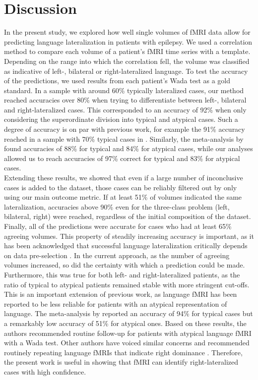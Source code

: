 \documentclass[fleqn,10pt]{SelfArx} %
\begin{document}
\section{Discussion}

In the present study, we explored how well single volumes of fMRI data allow for predicting language lateralization in patients with epilepsy. We used a correlation method to compare each volume of a patient’s fMRI time series with a template. Depending on the range into which the correlation fell, the volume was classified as indicative of left-, bilateral or right-lateralized language. To test the accuracy of the predictions, we used results from each patient’s Wada test as a gold standard. In a sample with around 60\% typically lateralized cases, our method reached accuracies over 80\% when trying to differentiate between left-, bilateral and right-lateralized cases. This corresponded to an accuracy of 92\% when only considering the superordinate division into typical and atypical cases. Such a degree of accuracy is on par with previous work, for example the 91\% accuracy reached in a sample with 70\% typical cases in \citet{Woermann_2003}. Similarly, the meta-analysis by \citet{Dym_2011} found accuracies of 88\% for typical and 84\% for atypical cases, while our analyses allowed us to reach accuracies of 97\% correct for typical and 83\% for atypical cases.\\
Extending these results, we showed that even if a large number of inconclusive cases is added to the dataset, those cases can be reliably filtered out by only using our main outcome metric. If at least 51\% of volumes indicated the same lateralization, accuracies above 90\% even for the three-class problem (left, bilateral, right) were reached, regardless of the initial composition of the dataset. Finally, all of the predictions were accurate for cases who had at least 65\% agreeing volumes. This property of steadily increasing accuracy is important, as it has been acknowledged that successful language lateralization critically depends on data pre-selection \citep{Wilke_2007, Benjamin_2017, Wegrzyn_2019}. In the current approach, as the number of agreeing volumes increased, so did the certainty with which a prediction could be made. Furthermore, this was true for both left- and right-lateralized patients, as the ratio of typical to atypical patients remained stable with more stringent cut-offs. This is an important extension of previous work, as language fMRI has been reported to be less reliable for patients with an atypical representation of language. The meta-analysis by \citet{Bauer_2014} reported an accuracy of 94\% for typical cases but a remarkably low accuracy of 51\% for atypical ones. Based on these results, the authors recommended routine follow-up for patients with atypical language fMRI with a Wada test. Other authors have voiced similar concerns and recommended routinely repeating language fMRIs that indicate right dominance \citep{Benjamin_2018}. Therefore, the present work is useful in showing that fMRI can identify right-lateralized cases with high confidence.\\
\end{document}
